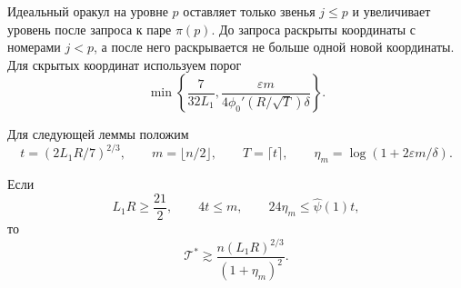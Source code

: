 Идеальный оракул на уровне $p$ оставляет только звенья
$j\le p$ и увеличивает уровень после запроса к паре $\pi(p)$.
До запроса раскрыты координаты с номерами $j<p$, а после него раскрывается не больше одной новой координаты.
Для скрытых координат используем порог
\[
 \min\left\{\frac7{32L_1},
 \frac{\varepsilon m}{4\phi_0'(R/\sqrt T)\delta}\right\}.
\]

Для следующей леммы положим
\[
 t=(2L_1R/7)^{2/3},\qquad m=\lfloor n/2\rfloor,\qquad
 T=\lceil t\rceil,\qquad \eta_m=\log(1+2\varepsilon m/\delta).
\]

\begin{lemma}\label{lem:lower-Q}
Если
\begin{equation}\label{eq:lower-Q-regime}
 L_1R\ge\frac{21}{2},\qquad 4t\le m,\qquad
 24\eta_m\le\widehat\psi(1)t,
\end{equation}
то
\begin{equation}\label{eq:lower-Q}
 \mathcal T^\ast\gtrsim
 \frac{n(L_1R)^{2/3}}{(1+\eta_m)^2}.
\end{equation}
\end{lemma}

